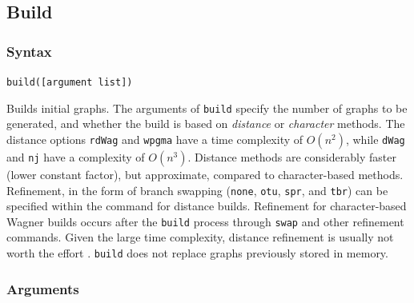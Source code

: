 \subsection{Build}
	\subsubsection{Syntax}
		\texttt{build([argument list])}
	
	\begin{phygdescription}
		{Builds initial graphs. The arguments of \texttt{build} specify the number of graphs 
		to be generated, and whether the build is based on \textit{distance} or \textit{character} 
		methods. The distance options \texttt{rdWag} and \texttt{wpgma} have a time complexity 
		of $O(n^2)$, while \texttt{dWag} and \texttt{nj} have a complexity of $O(n^3)$. Distance 
		methods are considerably faster (lower constant factor), but approximate, compared to 
		character-based methods. Refinement, in the form of branch swapping (\texttt{none}, 
		\texttt{otu}, \texttt{spr}, and \texttt{tbr}) can be specified within the command for distance 
		builds. Refinement for character-based Wagner builds occurs after the \texttt{build} 
		process through \texttt{swap} and other refinement commands. Given the large time 
		complexity, distance refinement is usually not worth the effort \citep{Wheeler2021}. 
		\texttt{build} does not replace graphs previously 
		stored in memory.}
	\end{phygdescription}
		
	\subsubsection{Arguments}

